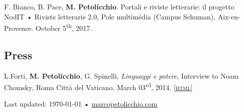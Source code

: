 \documentclass[9pt, a4paper]{article}
\newcommand{\amper}{{\fontspec[Scale=.95]{Adobe Caslon Pro}\selectfont\itshape\&}}
\newcommand{\html}[1]{\href{#1}{\scriptsize\textsc{[html]}}}
\begin{document}
F. Bianco, B. Pace, \textbf{M. Petolicchio}. Portali e riviste letterarie: il progetto NodIT • Riviste letterarie 2.0, Pole multimédia (Campus Schuman), Aix-en-Provence. October 5\textsuperscript{th}, 2017. 








\subsection{Press}

L.Forti, \textbf{M. Petolicchio}, G. Spinelli, \emph{Linguaggi e potere}, Interview to Noam Chomsky, Roma Città del Vaticano. March 03\textsuperscript{rd}, 2014. \html{http://www.letterefilosofia.com/linguaggi-e-potere-intervista-a-noam-chomsky/} 







\vfill
\begin{center}
{\scriptsize  Last updated: \today\- • \href{http://marcopetolicchio.com}{marcopetolicchio.com}}
\end{center}
\end{document}
